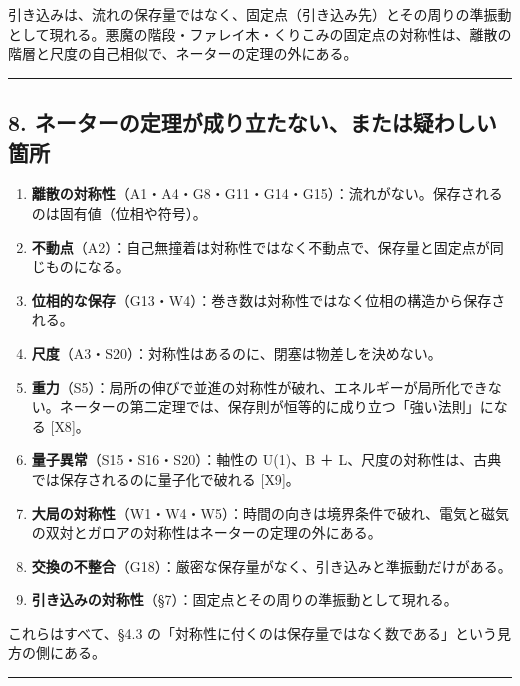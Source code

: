 \documentclass[
  a4paper,
]{ltjsarticle}
\providecommand{\tightlist}{%
  \setlength{\itemsep}{0pt}\setlength{\parskip}{0pt}}
\begin{document}
引き込みは、流れの保存量ではなく、固定点（引き込み先）とその周りの準振動として現れる。悪魔の階段・ファレイ木・くりこみの固定点の対称性は、離散の階層と尺度の自己相似で、ネーターの定理の外にある。

\begin{center}\rule{0.5\linewidth}{0.5pt}\end{center}

\subsection{8.
ネーターの定理が成り立たない、または疑わしい箇所}\label{ux30cdux30fcux30bfux30fcux306eux5b9aux7406ux304cux6210ux308aux7acbux305fux306aux3044ux307eux305fux306fux7591ux308fux3057ux3044ux7b87ux6240}

\begin{enumerate}
\def\labelenumi{\arabic{enumi}.}
\tightlist
\item
  \textbf{離散の対称性}（A1・A4・G8・G11・G14・G15）：流れがない。保存されるのは固有値（位相や符号）。
\item
  \textbf{不動点}（A2）：自己無撞着は対称性ではなく不動点で、保存量と固定点が同じものになる。
\item
  \textbf{位相的な保存}（G13・W4）：巻き数は対称性ではなく位相の構造から保存される。
\item
  \textbf{尺度}（A3・S20）：対称性はあるのに、閉塞は物差しを決めない。
\item
  \textbf{重力}（S5）：局所の伸びで並進の対称性が破れ、エネルギーが局所化できない。ネーターの第二定理では、保存則が恒等的に成り立つ「強い法則」になる
  {[}X8{]}。
\item
  \textbf{量子異常}（S15・S16・S20）：軸性の U(1)、B ＋
  L、尺度の対称性は、古典では保存されるのに量子化で破れる {[}X9{]}。
\item
  \textbf{大局の対称性}（W1・W4・W5）：時間の向きは境界条件で破れ、電気と磁気の双対とガロアの対称性はネーターの定理の外にある。
\item
  \textbf{交換の不整合}（G18）：厳密な保存量がなく、引き込みと準振動だけがある。
\item
  \textbf{引き込みの対称性}（§7）：固定点とその周りの準振動として現れる。
\end{enumerate}

これらはすべて、§4.3
の「対称性に付くのは保存量ではなく数である」という見方の側にある。

\begin{center}\rule{0.5\linewidth}{0.5pt}\end{center}
\end{document}
